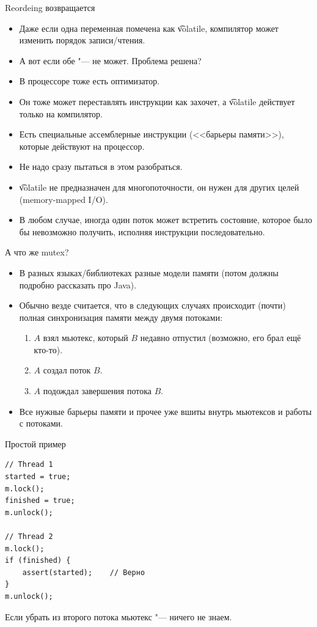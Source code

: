 \begin{frame}{Reordeing возвращается}
	\begin{itemize}
		\item Даже если одна переменная помечена как \t{volatile}, компилятор может изменить порядок записи/чтения.
		\item А вот если обе "--- не может. Проблема решена? \pause
		\item В процессоре тоже есть оптимизатор.
		\item Он тоже может переставлять инструкции как захочет, а \t{volatile} действует только на компилятор.
		\item Есть специальные ассемблерные инструкции (<<барьеры памяти>>), которые действуют на процессор.
		\item Не надо сразу пытаться в этом разобраться.
		\item \t{volatile} не предназначен для многопоточности, он нужен для других целей (memory-mapped I/O).
		\item В любом случае, иногда один поток может встретить состояние, которое было бы невозможно получить, исполняя инструкции последовательно.
	\end{itemize}
\end{frame}

\begin{frame}{А что же mutex?}
	\begin{itemize}
		\item В разных языках/библиотеках разные модели памяти (потом должны подробно рассказать про Java).
		\item Обычно везде считается, что в следующих случаях происходит (почти) полная синхронизация памяти между двумя потоками:
			\begin{enumerate}
				\item $A$ взял мьютекс, который $B$ недавно отпустил (возможно, его брал ещё кто-то).
				\item $A$ создал поток $B$.
				\item $A$ подождал завершения потока $B$.
			\end{enumerate}
		\item Все нужные барьеры памяти и прочее уже вшиты внутрь мьютексов и работы с потоками.
	\end{itemize}
\end{frame}

\begin{frame}[fragile]{Простой пример}
\begin{verbatim}
// Thread 1
started = true;
m.lock();
finished = true;
m.unlock();

// Thread 2
m.lock();
if (finished) {
    assert(started);    // Верно
}
m.unlock();
\end{verbatim}
	Если убрать из второго потока мьютекс "--- ничего не знаем.
\end{frame}

